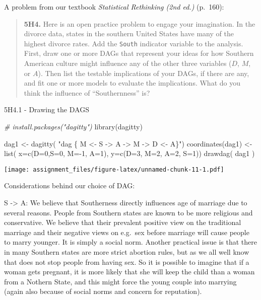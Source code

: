 \documentclass[
]{article}
\newenvironment{Shaded}{\begin{snugshade}}{\end{snugshade}}
\newcommand{\AttributeTok}[1]{\textcolor[rgb]{0.77,0.63,0.00}{#1}}
\newcommand{\CommentTok}[1]{\textcolor[rgb]{0.56,0.35,0.01}{\textit{#1}}}
\newcommand{\DecValTok}[1]{\textcolor[rgb]{0.00,0.00,0.81}{#1}}
\newcommand{\FunctionTok}[1]{\textcolor[rgb]{0.00,0.00,0.00}{#1}}
\newcommand{\NormalTok}[1]{#1}
\newcommand{\OtherTok}[1]{\textcolor[rgb]{0.56,0.35,0.01}{#1}}
\newcommand{\SpecialCharTok}[1]{\textcolor[rgb]{0.00,0.00,0.00}{#1}}
\newcommand{\StringTok}[1]{\textcolor[rgb]{0.31,0.60,0.02}{#1}}
\begin{document}
A problem from our textbook \emph{Statistical Rethinking (2nd ed.)}
(p.~160):

\begin{quote}
\textbf{5H4.} Here is an open practice problem to engage your
imagination. In the divorce data, states in the southern United States
have many of the highest divorce rates. Add the \texttt{South} indicator
variable to the analysis. First, draw one or more DAGs that represent
your ideas for how Southern American culture might influence any of the
other three variables (\(D\), \(M\), or \(A\)). Then list the testable
implications of your DAGs, if there are any, and fit one or more models
to evaluate the implications. What do you think the influence of
``Southernness'' is?
\end{quote}

5H4.1 - Drawing the DAGS

\begin{Shaded}
\begin{Highlighting}[]
\CommentTok{\# install.packages("dagitty")}
\FunctionTok{library}\NormalTok{(dagitty)}

\NormalTok{dag1 }\OtherTok{\textless{}{-}} \FunctionTok{dagitty}\NormalTok{( }\StringTok{"dag \{ M \textless{}{-} S {-}\textgreater{} A {-}\textgreater{} M {-}\textgreater{} D \textless{}{-} A\}"}\NormalTok{)}
\FunctionTok{coordinates}\NormalTok{(dag1) }\OtherTok{\textless{}{-}} \FunctionTok{list}\NormalTok{( }\AttributeTok{x=}\FunctionTok{c}\NormalTok{(}\AttributeTok{D=}\DecValTok{0}\NormalTok{,}\AttributeTok{S=}\DecValTok{0}\NormalTok{, }\AttributeTok{M=}\SpecialCharTok{{-}}\DecValTok{1}\NormalTok{, }\AttributeTok{A=}\DecValTok{1}\NormalTok{), }\AttributeTok{y=}\FunctionTok{c}\NormalTok{(}\AttributeTok{D=}\DecValTok{3}\NormalTok{, }\AttributeTok{M=}\DecValTok{2}\NormalTok{, }\AttributeTok{A=}\DecValTok{2}\NormalTok{, }\AttributeTok{S=}\DecValTok{1}\NormalTok{))}
\FunctionTok{drawdag}\NormalTok{( dag1 )}
\end{Highlighting}
\end{Shaded}

\texttt{[image: assignment\_files/figure-latex/unnamed-chunk-11-1.pdf]}

Considerations behind our choice of DAG:

S -\textgreater{} A: We believe that Southerness directly influences age
of marriage due to several reasons. People from Southern states are
known to be more religious and conservative. We believe that their
prevalent positive view on the traditional marriage and their negative
views on e.g.~sex before marriage will cause people to marry younger. It
is simply a social norm. Another practical issue is that there in many
Southern states are more strict abortion rules, but as we all well know
that does not stop people from having sex. So it is possible to imagine
that if a woman gets pregnant, it is more likely that she will keep the
child than a woman from a Nothern State, and this might force the young
couple into marrying (again also because of social norms and concern for
reputation).
\end{document}
